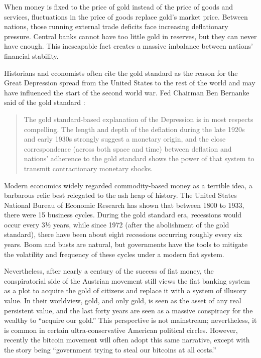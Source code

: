 When money is fixed to the price of gold instead of the price of goods and
services, fluctuations in the price of goods replace gold's market price.
Between nations, those running external trade deficits face increasing
deflationary pressure. Central banks cannot have too little gold in reserves,
but they can never have enough. This inescapable fact creates a massive
imbalance between nations' financial stability. \cite{roche_understanding_2011}

Historians and economists often cite the gold standard as the reason for the
Great Depression spread from the United States to the rest of the world and may
have influenced the start of the second world war. Fed Chairman Ben Bernanke
said of the gold standard \cite{bernanke_essays_2004}:

\begin{quote}
The gold standard-based explanation of the Depression is in most
respects compelling. The length and depth of the deflation during the
late 1920s and early 1930s strongly suggest a monetary origin, and the
close correspondence (across both space and time) between deflation and
nations' adherence to the gold standard shows the power of that system
to transmit contractionary monetary shocks.
\end{quote}

Modern economics widely regarded commodity-based money as a terrible idea, a
barbarous relic best relegated to the ash heap of history.
\cite{shea_survey_2012} The United States National Bureau of Economic Research
has shown that between 1800 to 1933, there were 15 business cycles. During the
gold standard era, recessions would occur every 3½ years, while since 1972
(after the abolishment of the gold standard), there have been about eight
recessions occurring roughly every six years. Boom and busts are natural, but
governments have the tools to mitigate the volatility and frequency of these
cycles under a modern fiat system.  \cite{mcleay_money_2014}

Nevertheless, after nearly a century of the success of fiat money, the
conspiratorial side of the Austrian movement still views the fiat banking system
as a plot to acquire the gold of citizens and replace it with a system of
illusory value. In their worldview, gold, and only gold, is seen as the asset of
any real persistent value, and the last forty years are seen as a massive
conspiracy for the wealthy to ``acquire our gold.'' This perspective is not
mainstream; nevertheless, it is common in certain ultra-conservative American
political circles. However, recently the bitcoin movement will often adopt this
same narrative, except with the story being ``government trying to steal our
bitcoins at all costs.''

